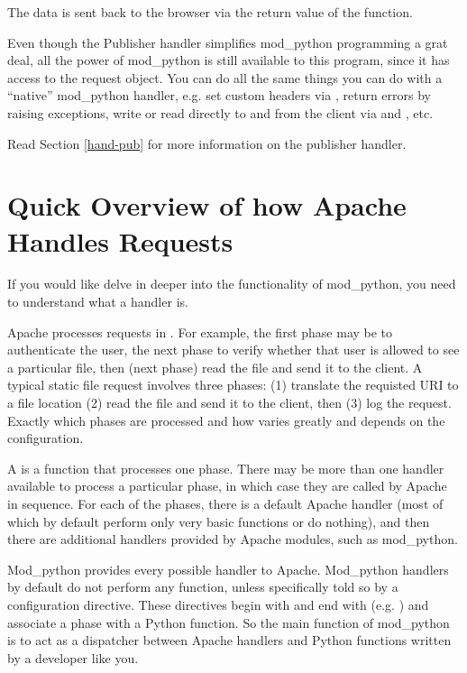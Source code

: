 The data is sent back to the browser via the return value of the
function.

Even though the Publisher handler simplifies mod_python programming a
grat deal, all the power of mod_python is still available to this
program, since it has access to the request object. You can do all the
same things you can do with a ``native'' mod_python handler, e.g. set
custom headers via , return errors by raising
 exceptions, write or read directly to
and from the client via  and ,
etc.

Read Section \ref{hand-pub} 
for more information on the publisher handler. 

\section{Quick Overview of how Apache Handles Requests\label{tut-overview}}

If you would like delve in deeper into the functionality of
mod_python, you need to understand what a handler is.  

Apache processes requests in . For example, the first
phase may be to authenticate the user, the next phase to verify
whether that user is allowed to see a particular file, then (next
phase) read the file and send it to the client. A typical static file
request involves three phases: (1) translate the requisted URI to a
file location (2) read the file and send it to the client, then (3)
log the request. Exactly which phases are processed and how varies
greatly and depends on the configuration.

A  is a function that processes one phase. There may be
more than one handler available to process a particular phase, in
which case they are called by Apache in sequence. For each of the
phases, there is a default Apache handler (most of which by default
perform only very basic functions or do nothing), and then there are
additional handlers provided by Apache modules, such as mod_python.

Mod_python provides every possible handler to Apache. Mod_python
handlers by default do not perform any function, unless specifically
told so by a configuration directive. These directives begin with
 and end with 
(e.g. ) and associate a phase with a Python
function. So the main function of mod_python is to act as a dispatcher
between Apache handlers and Python functions written by a developer
like you.

